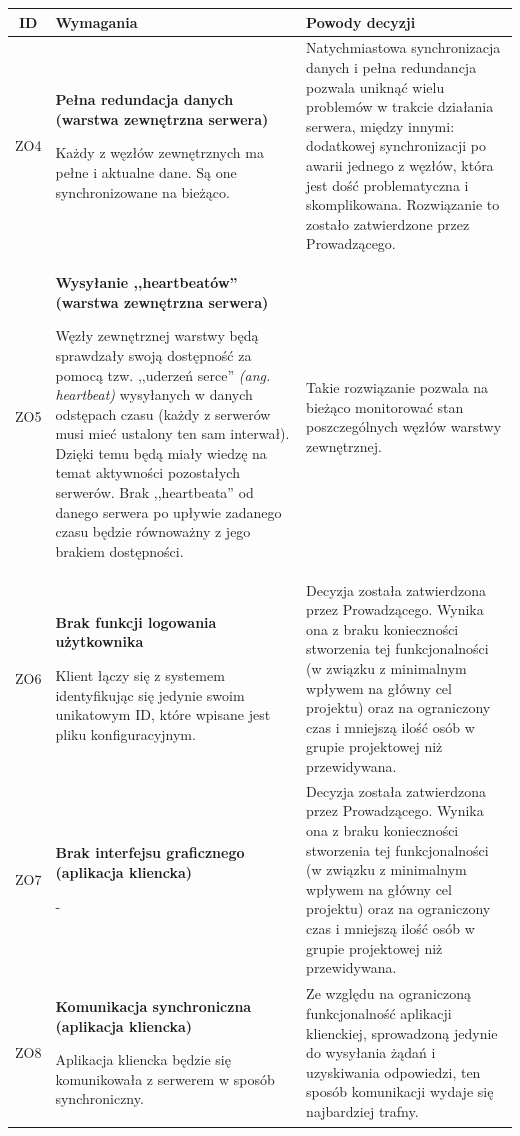 \pagebreak

\begin{tabularx}{\textwidth}{|c|X|X|}
\hline
\textbf{ID} & \textbf{Wymagania}  & \textbf{Powody decyzji} \\
\hline
\label{z:ZO4} ZO4 &  \textbf{Pełna redundacja danych (warstwa zewnętrzna serwera)}

Każdy z węzłów zewnętrznych ma pełne i aktualne dane. Są one synchronizowane na bieżąco. & 
Natychmiastowa synchronizacja danych i pełna redundancja pozwala uniknąć wielu problemów w trakcie działania serwera, między innymi: dodatkowej synchronizacji po awarii jednego z węzłów, która jest dość problematyczna i skomplikowana. Rozwiązanie to zostało zatwierdzone przez Prowadzącego.\\
\hline

\label{z:ZO5} ZO5 &  \textbf{Wysyłanie ,,heartbeatów'' (warstwa zewnętrzna serwera)}

Węzły zewnętrznej warstwy będą sprawdzały swoją dostępność za pomocą tzw. ,,uderzeń serce'' \textit{(ang. heartbeat)} wysyłanych w danych odstępach czasu (każdy z serwerów musi mieć ustalony ten sam interwał). Dzięki temu będą miały wiedzę na temat aktywności pozostałych serwerów. Brak ,,heartbeata'' od danego serwera po upływie zadanego czasu będzie równoważny z jego brakiem dostępności. & 
Takie rozwiązanie pozwala na bieżąco monitorować stan poszczególnych węzłów warstwy zewnętrznej. \\
\hline

\label{z:ZO6} ZO6 &  \textbf{Brak funkcji logowania użytkownika}

Klient łączy się z systemem identyfikując się jedynie swoim unikatowym ID, które wpisane jest pliku konfiguracyjnym. & 
Decyzja została zatwierdzona przez Prowadzącego. Wynika ona z braku konieczności stworzenia tej funkcjonalności (w związku z minimalnym wpływem na główny cel projektu) oraz na ograniczony czas i mniejszą ilość osób w grupie projektowej niż przewidywana.  \\
\hline

\label{z:ZO7} ZO7 &  \textbf{Brak interfejsu graficznego (aplikacja kliencka)}

- & 
Decyzja została zatwierdzona przez Prowadzącego. Wynika ona z braku konieczności stworzenia tej funkcjonalności (w związku z minimalnym wpływem na główny cel projektu) oraz na ograniczony czas i mniejszą ilość osób w grupie projektowej niż przewidywana.
\\
\hline
\label{z:ZO8} ZO8 &  \textbf{Komunikacja synchroniczna (aplikacja kliencka)}

Aplikacja kliencka będzie się komunikowała z serwerem w sposób synchroniczny. & 
Ze względu na ograniczoną funkcjonalność aplikacji klienckiej, sprowadzoną jedynie do wysyłania żądań i uzyskiwania odpowiedzi, ten sposób komunikacji wydaje się najbardziej trafny. \\
\hline

\end{tabularx}

